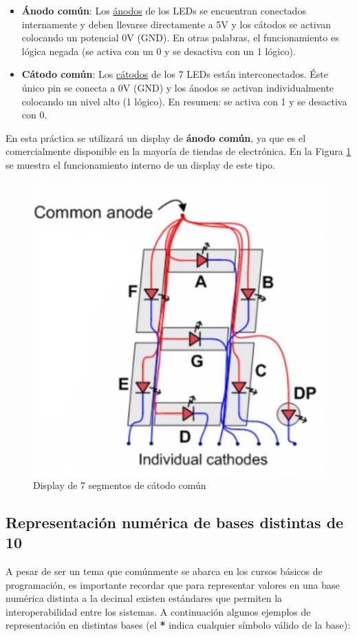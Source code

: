 \begin{itemize}
    \item \textbf{Ánodo común}: Los \underline{ánodos} de los LEDs se encuentran conectados internamente y deben llevarse directamente a 5V y los cátodos se activan colocando un potencial 0V (GND). En otras palabras,
    el funcionamiento es lógica negada (se activa con un 0 y se desactiva con un 1 lógico).
    \item \textbf{Cátodo común}: Los \underline{cátodos} de los 7 LEDs están interconectados. Éste único pin se conecta a 0V (GND) y los ánodos se activan individualmente colocando un 
    nivel alto (1 lógico). En resumen: se activa con 1 y se desactiva con 0.
\end{itemize}

En esta práctica se utilizará un display de \textbf{ánodo común}, ya que es el comercialmente disponible en la mayoría de tiendas de electrónica.
En la Figura \ref{Fig:CommonAnode} se muestra el funcionamiento interno de un display de este tipo.

\begin{figure}[H]
    \centering
    \includegraphics[scale=0.5]{images/CommonAnode.jpg}
    \caption{Display de 7 segmentos de cátodo común}
    \label{Fig:CommonAnode}
\end{figure}

\subsection{Representación numérica de bases distintas de 10}
A pesar de ser un tema que comúnmente se abarca en los cursos básicos de programación, es importante recordar que para representar valores
en una base numérica distinta a la decimal existen estándares que permiten la interoperabilidad entre los sistemas. A continuación algunos ejemplos
de representación en distintas bases (el \textbf{*} indica cualquier símbolo válido de la base):

